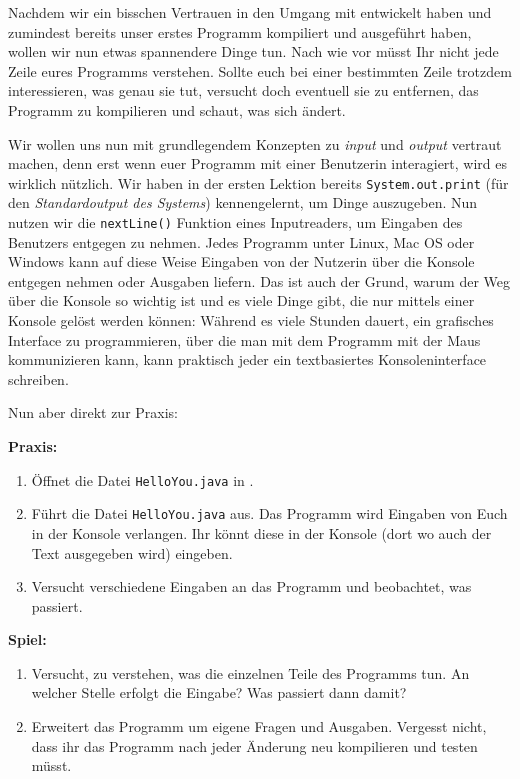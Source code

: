 
Nachdem wir ein bisschen Vertrauen in den Umgang mit \Eclipse entwickelt haben
und zumindest bereits unser erstes Programm kompiliert und ausgeführt haben,
wollen wir nun etwas spannendere Dinge tun. Nach wie vor müsst Ihr nicht jede
Zeile eures Programms verstehen. Sollte euch bei einer bestimmten Zeile trotzdem
interessieren, was genau sie tut, versucht doch eventuell sie zu entfernen, das
Programm zu kompilieren und schaut, was sich ändert.

Wir wollen uns nun mit grundlegendem Konzepten zu \emph{input} und \emph{output}
vertraut machen, denn erst wenn euer Programm mit einer Benutzerin interagiert,
wird es wirklich nützlich. Wir haben in der ersten Lektion bereits
\texttt{System.out.print} (für den \emph{Standardoutput des Systems})
kennengelernt, um Dinge auszugeben. Nun nutzen wir die \texttt{nextLine()}
Funktion eines Inputreaders, um Eingaben des Benutzers entgegen zu nehmen. Jedes
Programm unter Linux, Mac OS oder Windows kann auf diese Weise Eingaben von der
Nutzerin über die Konsole entgegen nehmen oder Ausgaben liefern. Das ist auch
der Grund, warum der Weg über die Konsole so wichtig ist und es viele Dinge
gibt, die nur mittels einer Konsole gelöst werden können: Während es viele
Stunden dauert, ein grafisches Interface zu programmieren, über die man mit dem
Programm mit der Maus kommunizieren kann, kann praktisch jeder ein textbasiertes
Konsoleninterface schreiben.

Nun aber direkt zur Praxis:

\textbf{Praxis:}
\begin{enumerate}
\item Öffnet die Datei \texttt{HelloYou.java} in \Eclipse.
\item Führt die Datei \texttt{HelloYou.java} aus. Das Programm wird Eingaben von
  Euch in der Konsole verlangen. Ihr könnt diese in der Konsole (dort wo auch
  der Text ausgegeben wird) eingeben.
\item Versucht verschiedene Eingaben an das Programm und beobachtet, was passiert.
\end{enumerate}


\textbf{Spiel:}

\begin{enumerate}
\item Versucht, zu verstehen, was die einzelnen Teile des Programms tun. An
  welcher Stelle erfolgt die Eingabe? Was passiert dann damit?
\item Erweitert das Programm um eigene Fragen und Ausgaben. Vergesst nicht, dass
  ihr das Programm nach jeder Änderung neu kompilieren und testen müsst.
\end{enumerate}
